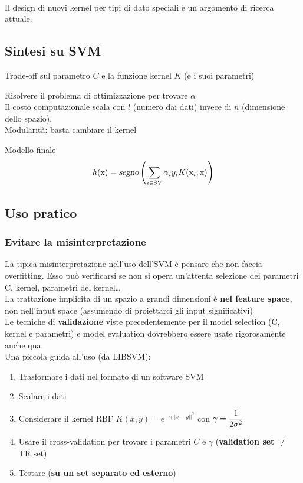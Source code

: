 \documentclass[10pt]{book}
\begin{document}
\paragraph{} Il design di nuovi kernel per tipi di dato speciali è un argomento di ricerca attuale.
\subsection{Sintesi su SVM}
\begin{list}{}{}
	\item Trade-off sul parametro $C$ e la funzione kernel $K$ (e i suoi parametri)
	\item Risolvere il problema di ottimizzazione per trovare $\alpha$\\
	Il costo computazionale scala con $l$ (numero dai dati) invece di $n$ (dimensione dello spazio).\\
	Modularità: basta cambiare il kernel
	\item Modello finale
	$$h(\text{x}) = \textsl{segno}\left(\sum_{i\in \text{SV}} \alpha_i y_i K(\text{x}_i, \text{x}) \right)$$
\end{list}
\subsection{Uso pratico}
\subsubsection{Evitare la misinterpretazione}
La tipica misinterpretazione nell'uso dell'SVM è pensare che non faccia overfitting. Esso può verificarsi se non si opera un'attenta selezione dei parametri C, kernel, parametri del kernel\ldots\\
La trattazione implicita di un spazio a grandi dimensioni è \textbf{nel feature space}, non nell'input space (assumendo di proiettarci gli input significativi)\\
Le tecniche di \textbf{validazione} viste precedentemente per il model selection (C, kernel e parametri) e model evaluation dovrebbero essere usate rigorosamente anche qua.\\
Una piccola guida all'uso (da LIBSVM):
\begin{enumerate}
	\item Trasformare i dati nel formato di un software SVM
	\item Scalare i dati
	\item Considerare il kernel RBF $K(x, y) = e^{-\gamma||x-y||^2}$ con $\gamma = \mathlarger{\frac{1}{2\sigma^2}}$
	\item Usare il cross-validation per trovare i parametri $C$ e $\gamma$ (\textbf{validation set} $\neq$ TR set)
	\item Testare (\textbf{su un set separato ed esterno})
\end{enumerate}
\end{document}
